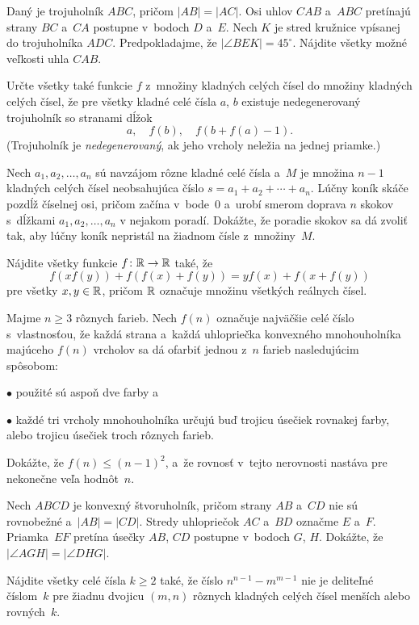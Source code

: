{%
Daný je trojuholník $ABC$, pričom $|AB|=|AC|$.
Osi uhlov $CAB$ a~$ABC$ pretínajú strany $BC$ a~$CA$ postupne v~bodoch $D$ a~$E$.
Nech $K$ je stred kružnice vpísanej do trojuholníka $ADC$.
Predpokladajme, že $|\angle BEK| = 45^\circ$.
Nájdite všetky možné veľkosti uhla $CAB$.}

{%
Určte všetky také funkcie $f$ z~množiny kladných celých čísel do množiny kladných celých čísel, že pre všetky kladné celé čísla $a$, $b$ existuje nedegenerovaný trojuholník so stranami dĺžok
$$
a,\quad f(b),\quad f(b+f(a)-1).
$$
(Trojuholník je {\it nedegenerovaný}, ak jeho vrcholy neležia na jednej priamke.)}

{%
Nech $a_1,a_2,\dots,a_n$ sú navzájom rôzne kladné celé čísla a~$M$ je množina $n-1$ kladných celých čísel neobsahujúca číslo $s=a_1+a_2+\cdots+a_n$.
Lúčny koník skáče pozdĺž číselnej osi, pričom začína v~bode~$0$ a~urobí smerom doprava $n$ skokov s~dĺžkami $a_1,a_2,\dots,a_n$ v nejakom poradí.
Dokážte, že poradie skokov sa dá zvoliť tak, aby lúčny koník nepristál na žiadnom čísle z~množiny~$M$.}

{%
Nájdite všetky funkcie $f\colon\Bbb R\to\Bbb R$ také, že
$$
f(xf(y)) + f(f(x) + f(y)) = yf(x) + f(x + f(y))
$$
pre všetky $x, y\in\Bbb R$, pričom $\Bbb R$ označuje množinu všetkých reálnych čísel.}

{%
Majme $n\ge3$ rôznych farieb. Nech $f(n)$ označuje najväčšie celé číslo s~vlastnosťou, že
každá strana a~každá uhlopriečka konvexného mnohouholníka majúceho $f(n)$ vrcholov sa dá ofarbiť
jednou z~$n$ farieb nasledujúcim spôsobom:
\item{$\bullet$} použité sú aspoň dve farby a
\item{$\bullet$} každé tri vrcholy mnohouholníka určujú buď trojicu úsečiek rovnakej farby, alebo trojicu úsečiek troch rôznych farieb.

Dokážte, že $f(n)\le (n-1)^2$, a~že rovnosť v~tejto nerovnosti nastáva pre nekonečne veľa hodnôt~$n$.}

{%
Nech $ABCD$ je konvexný štvoruholník, pričom strany $AB$ a~$CD$ nie sú rovnobežné a~$|AB|=|CD|$.
Stredy uhlopriečok $AC$ a~$BD$ označme $E$ a~$F$. Priamka~$EF$ pretína úsečky $AB$, $CD$
postupne v~bodoch $G$, $H$. Dokážte, že $|\angle AGH|=|\angle DHG|$.}

{%
Nájdite všetky celé čísla $k \ge 2$ také, že číslo $n^{n-1}-m^{m-1}$ nie je deliteľné číslom~$k$ pre žiadnu dvojicu $(m,n)$ rôznych kladných celých čísel menších alebo rovných~$k$.}

